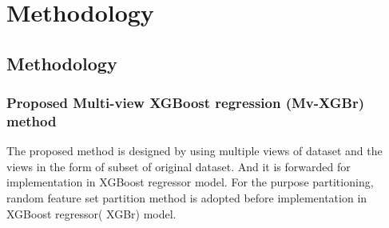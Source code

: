 
\chapter{Methodology} %

\label{c4} %


 \section{Methodology}
 
 \subsection{Proposed Multi-view XGBoost regression (Mv-XGBr) method}
The proposed method is designed by using multiple views of dataset and the views in the form of subset of original dataset. And it is forwarded for implementation in XGBoost regressor model. For the purpose partitioning, random feature set partition method is adopted before implementation in XGBoost regressor( XGBr) model.

